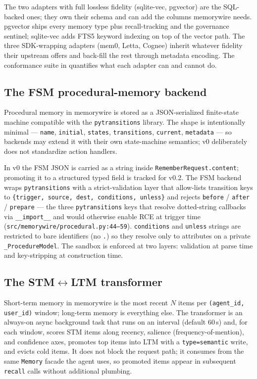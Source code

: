 \documentclass[11pt,letterpaper,twocolumn]{article}
\begin{document}
The two adapters with full lossless fidelity (sqlite-vec, pgvector) are the SQL-backed ones; they own their schema and can add the columns memorywire needs. pgvector ships every memory type plus recall-tracking and the governance sentinel; sqlite-vec adds FTS5 keyword indexing on top of the vector path. The three SDK-wrapping adapters (mem0, Letta, Cognee) inherit whatever fidelity their upstream offers and back-fill the rest through metadata encoding. The conformance suite in  quantifies what each adapter can and cannot do.

\subsection{The FSM procedural-memory backend}
\label{sec:impl-fsm}

Procedural memory in memorywire is stored as a JSON-serialized finite-state machine compatible with the \texttt{pytransitions} library. The shape is intentionally minimal --- \texttt{name}, \texttt{initial}, \texttt{states}, \texttt{transitions}, \texttt{current}, \texttt{metadata} --- so backends may extend it with their own state-machine semantics; v0 deliberately does not standardize action handlers.

In v0 the FSM JSON is carried as a string inside \texttt{RememberRequest.content}; promoting it to a structured typed field is tracked for v0.2. The FSM backend wraps \texttt{pytransitions} with a strict-validation layer that allow-lists transition keys to \texttt{\{trigger, source, dest, conditions, unless\}} and rejects \texttt{before} / \texttt{after} / \texttt{prepare} --- the three \texttt{pytransitions} keys that resolve dotted-string callbacks via \texttt{\_\_import\_\_} and would otherwise enable RCE at trigger time (\texttt{src/memorywire/procedural.py:44--59}). \texttt{conditions} and \texttt{unless} strings are restricted to bare identifiers (no \texttt{.}) so they resolve only to attributes on a private \texttt{\_ProcedureModel}. The sandbox is enforced at two layers: validation at parse time and key-stripping at construction time.

\subsection{The STM$\leftrightarrow$LTM transformer}
\label{sec:impl-stm-ltm}

Short-term memory in memorywire is the most recent $N$ items per \texttt{(agent\_id, user\_id)} window; long-term memory is everything else. The transformer is an always-on async background task that runs on an interval (default 60\,s) and, for each window, scores STM items along recency, salience (frequency-of-mention), and confidence axes, promotes top items into LTM with a \texttt{type=semantic} write, and evicts cold items. It does not block the request path; it consumes from the same \texttt{Memory} facade the agent uses, so promoted items appear in subsequent \texttt{recall} calls without additional plumbing.
\end{document}
